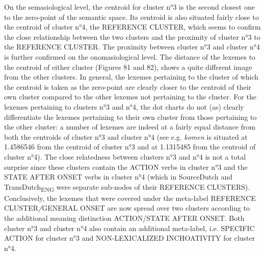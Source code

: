 On the semasiological level, the centroid for cluster n°3 is the second closest one to the zero-point of the semantic space. Its centroid is also situated fairly close to the centroid of cluster n°4, the REFERENCE CLUSTER, which seems to confirm the close relationship between the two clusters and the proximity of cluster n°3 to the REFERENCE CLUSTER. The proximity between cluster n°3 and cluster n°4 is further confirmed on the onomasiological level. The distance of the lexemes to the centroid of either cluster (Figures 81 and 82), shows a quite different image from the other clusters. In general, the lexemes pertaining to the cluster of which the centroid is taken as the zero-point are clearly closer to the centroid of their own cluster compared to the other lexemes not pertaining to the cluster. For the lexemes pertaining to clusters n°3 and n°4, the dot charts do not (as) clearly differentiate the lexemes pertaining to their own cluster from those pertaining to the other cluster: a number of lexemes are indeed at a fairly equal distance from both the centroids of cluster n°3 and cluster n°4 (see e.g. \textit{komen} is situated at 1.4586546 from the centroid of cluster n°3 and at 1.1315485 from the centroid of cluster n°4). The close relatedness between clusters n°3 and n°4 is not a total surprise since these clusters contain the ACTION verbs in cluster n°3 and the STATE AFTER ONSET verbs in cluster n°4 (which in SourceDutch and TransDutch\textsubscript{ENG} were separate sub-nodes of their REFERENCE CLUSTERS). Conclusively, the lexemes that were covered under the meta-label REFERENCE CLUSTER\textit{/}GENERAL ONSET are now spread over two clusters according to the additional meaning distinction ACTION/STATE AFTER ONSET. Both cluster n°3 and cluster n°4 also contain an additional meta-label, i.e. {SPECIFIC} ACTION for cluster n°3 and {NON-LEXICALIZED INCHOATIVITY} for cluster n°4.


